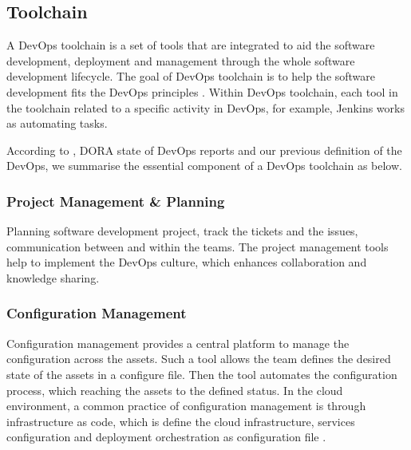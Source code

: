 \subsection{Toolchain}
A DevOps toolchain is a set of tools that are integrated to aid the software development, deployment and management through the whole software development lifecycle. The goal of DevOps toolchain is to help the software development fits the DevOps principles \cite{DevOpsto7:online}\cite{Toolchai10:online}\cite{WhatisaD20:online}. Within DevOps toolchain, each tool in the toolchain related to a specific activity in DevOps, for example, Jenkins works as automating tasks.
\par
According to \cite{WhatisaD20:online}, DORA state of DevOps reports \cite{forsgrenaccelerate}\cite{velasquez2014state}\cite{forsgren20192019} and our previous definition of the DevOps, we summarise the essential component of a DevOps toolchain as below.
\subsubsection{Project Management \& Planning}
Planning software development project, track the tickets and the issues, communication between and within the teams. The project management tools help to implement the DevOps culture, which enhances collaboration and knowledge sharing.
\subsubsection{Configuration Management}
Configuration management provides a central platform to manage the configuration across the assets. Such a tool allows the team defines the desired state of the assets in a configure file. Then the tool automates the configuration process, which reaching the assets to the defined status. In the cloud environment, a common practice of configuration management is through infrastructure as code, which is define the cloud infrastructure, services configuration and deployment orchestration as configuration file \cite{7965401}.
